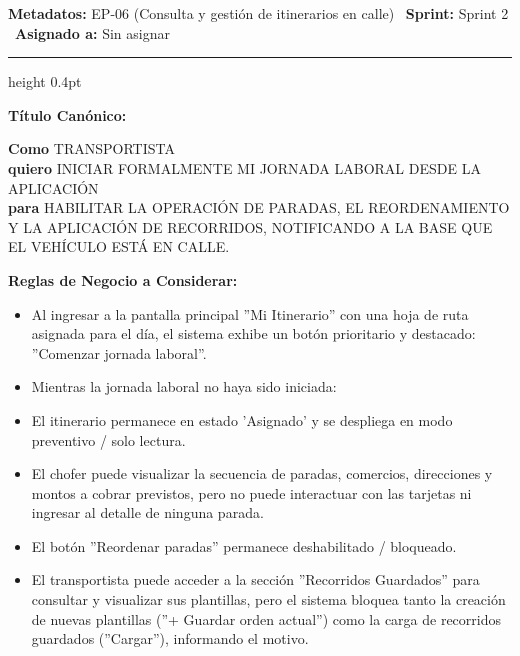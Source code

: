 \documentclass[a4paper,9pt]{article}
\begin{document}
\begin{tcolorbox}[hucard, title={\textbf{HU-236: INICIAR JORNADA LABORAL Y HABILITACIÓN HOJA DE RUTA} \hfill \scriptsize \colorbox{tealstatus}{\textbf{\ Accepted\ }} \quad \colorbox{white}{\textcolor{primarydark}{\textbf{\ 5 pts\ }}}}]
\vspace{-1pt}
\noindent\textbf{\footnotesize Metadatos:} EP-06 (Consulta y gestión de itinerarios en calle) \textbar\ \textbf{Sprint:} Sprint 2 \textbar\ \textbf{Asignado a:} Sin asignar\par\vspace{2pt}
\hrule height 0.4pt\par\vspace{3pt}
\noindent\textbf{\footnotesize Título Canónico:}\par\vspace{1pt}
{\small \textbf{Como} TRANSPORTISTA \\ \textbf{quiero} INICIAR FORMALMENTE MI JORNADA LABORAL DESDE LA APLICACIÓN \\ \textbf{para} HABILITAR LA OPERACIÓN DE PARADAS, EL REORDENAMIENTO Y LA APLICACIÓN DE RECORRIDOS, NOTIFICANDO A LA BASE QUE EL VEHÍCULO ESTÁ EN CALLE.}\par\vspace{3pt}
\noindent\textbf{\footnotesize Reglas de Negocio a Considerar:}\par\vspace{1pt}
{\footnotesize
\begin{itemize}[leftmargin=12pt, nosep, itemsep=1.5pt, topsep=1pt]
\item Al ingresar a la pantalla principal ''Mi Itinerario'' con una hoja de ruta asignada para el día, el sistema exhibe un botón prioritario y destacado: ''Comenzar jornada laboral''.
\item Mientras la jornada laboral no haya sido iniciada:
\item El itinerario permanece en estado 'Asignado' y se despliega en modo preventivo / solo lectura.
\item El chofer puede visualizar la secuencia de paradas, comercios, direcciones y montos a cobrar previstos, pero no puede interactuar con las tarjetas ni ingresar al detalle de ninguna parada.
\item El botón ''Reordenar paradas'' permanece deshabilitado / bloqueado.
\item El transportista puede acceder a la sección ''Recorridos Guardados'' para consultar y visualizar sus plantillas, pero el sistema bloquea tanto la creación de nuevas plantillas (''+ Guardar orden actual'') como la carga de recorridos guardados (''Cargar''), informando el motivo.

\end{itemize}}
\end{tcolorbox}
\end{document}
